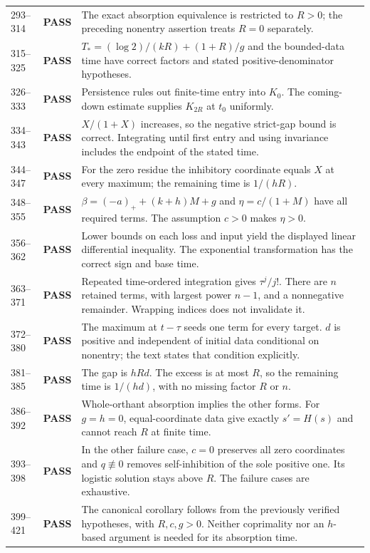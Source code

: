 \documentclass[11pt]{article}
\newcommand{\pass}{\textbf{PASS}}
\begin{document}
\begin{longtable}{@{}P{0.12\textwidth}P{0.12\textwidth}P{0.71\textwidth}@{}}
293--314 & \pass & The exact absorption equivalence is restricted to
$R>0$; the preceding nonentry assertion treats $R=0$ separately. \\
315--325 & \pass & $T_*=(\log2)/(kR)+(1+R)/g$ and the bounded-data time
have correct factors and stated positive-denominator hypotheses. \\
326--333 & \pass & Persistence rules out finite-time entry into $K_0$.
The coming-down estimate supplies $K_{2R}$ at $t_0$ uniformly. \\
334--343 & \pass & $X/(1+X)$ increases, so the negative strict-gap bound
is correct. Integrating until first entry and using invariance includes
the endpoint of the stated time. \\
344--347 & \pass & For the zero residue the inhibitory coordinate equals
$X$ at every maximum; the remaining time is $1/(hR)$. \\
348--355 & \pass & $\beta=(-a)_++(k+h)M+g$ and $\eta=c/(1+M)$ have
all required terms. The assumption $c>0$ makes $\eta>0$. \\
356--362 & \pass & Lower bounds on each loss and input yield the displayed
linear differential inequality. The exponential transformation has the
correct sign and base time. \\
363--371 & \pass & Repeated time-ordered integration gives $\tau^j/j!$.
There are $n$ retained terms, with largest power $n-1$, and a nonnegative
remainder. Wrapping indices does not invalidate it. \\
372--380 & \pass & The maximum at $t-\tau$ seeds one term for every target.
$d$ is positive and independent of initial data conditional on nonentry;
the text states that condition explicitly. \\
381--385 & \pass & The gap is $hRd$. The excess is at most $R$, so the
remaining time is $1/(hd)$, with no missing factor $R$ or $n$. \\
386--392 & \pass & Whole-orthant absorption implies the other forms.
For $g=h=0$, equal-coordinate data give exactly $s'=H(s)$ and cannot
reach $R$ at finite time. \\
393--398 & \pass & In the other failure case, $c=0$ preserves all zero
coordinates and $q\not\equiv0$ removes self-inhibition of the sole positive
one. Its logistic solution stays above $R$. The failure cases are exhaustive. \\
399--421 & \pass & The canonical corollary follows from the previously
verified hypotheses, with $R,c,g>0$. Neither coprimality nor an $h$-based
argument is needed for its absorption time. \\

\end{longtable}
\end{document}
